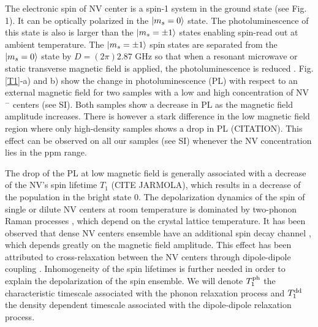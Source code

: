 \documentclass[preprintnumbers,amsmath,amssymb,superscriptaddress,twocolumn,showpacs]{revtex4-2}
\begin{document}
The electronic spin of NV center is a spin-1 system in the ground state (see Fig. 1). It can be optically polarized in the $\ket{m_s=0}$ state. The photoluminescence of this state is also is larger than the $\ket{m_s=\pm 1}$ states enabling spin-read out at ambient temperature. The $\ket{m_s=\pm 1}$ spin states are separated from the $\ket{m_s=0}$ state by  $D = (2\pi) 2.87$ GHz so that when a resonant microwave or static transverse magnetic field is applied, the photoluminescence is reduced \citep{epstein2005anisotropic,lai2009influence}. 
Fig.  \ref{T1}-a) and b) show the change in photoluminescence (PL) with respect to an external magnetic field for two samples with a low and high concentration of NV$^-$ centers (see SI). Both samples show a decrease in PL as the magnetic field amplitude increases.  There is however a stark difference in the low magnetic field region where only high-density samples shows a drop in PL (CITATION). This effect can be observed on all our samples (see SI) whenever the NV concentration lies in the ppm range.

The drop of the PL at low magnetic field is generally associated with a decrease of the NV's spin lifetime $T_1$ (CITE JARMOLA), which results in a decrease of the population in the bright state $0$.
The depolarization dynamics of the spin of single or dilute NV centers at room temperature is dominated by two-phonon Raman processes \citep{redman1991spin,jarmola_temperature-_2012,norambuena2018spin}, which depend on the crystal lattice temperature. It has been observed that dense NV centers ensemble have an additional spin decay channel \citep{jarmola_temperature-_2012,jarmola_longitudinal_2015,mrozek_longitudinal_2015, choi_depolarization_2017, akhmedzhanov_microwave-free_2017, akhmedzhanov_magnetometry_2019, pellet2021magnetic, mrozek2021characterization}, which depends greatly on the magnetic field amplitude. This effect has been attributed to cross-relaxation between the NV centers through dipole-dipole coupling \citep{mrozek_longitudinal_2015, choi_depolarization_2017}.  Inhomogeneity of the spin lifetimes is further needed in order to explain the depolarization of the spin ensemble. We will denote $T_1^{\rm ph}$ the characteristic timescale associated with the phonon relaxation process and $T_1^{\rm dd}$ the density dependent timescale associated with the dipole-dipole relaxation process.
\end{document}

